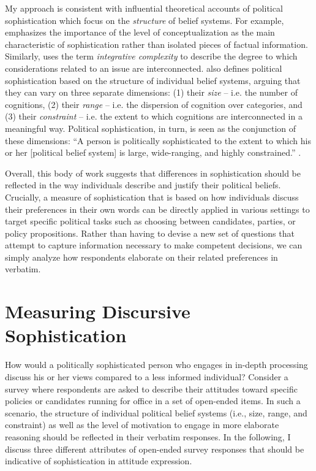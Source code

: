 My approach is consistent with influential theoretical accounts of political sophistication which focus on the \textit{structure} of belief systems. For example, \citet{converse1964nature} emphasizes the importance of the level of conceptualization as the main characteristic of sophistication rather than isolated pieces of factual information. Similarly, \citet{tetlock1983cognitive,tetlock1993cognitive} uses the term \textsl{integrative complexity} to describe the degree to which considerations related to an issue are interconnected. \citet{luskin1987measuring} also defines political sophistication based on the structure of individual belief systems, arguing that they can vary on three separate dimensions: (1) their \textsl{size} -- i.e. the number of cognitions, (2) their \textsl{range} -- i.e. the dispersion of cognition over categories, and (3) their \textsl{constraint} -- i.e. the extent to which cognitions are interconnected in a meaningful way. Political sophistication, in turn, is seen as the conjunction of these dimensions: ``A person is politically sophisticated to the extent to which his or her [political belief system] is large, wide-ranging, and highly constrained.'' \citep[860]{luskin1987measuring}.

Overall, this body of work suggests that differences in sophistication should be reflected in the way individuals describe and justify their political beliefs. Crucially, a measure of sophistication that is based on how individuals discuss their preferences in their own words can be directly applied in various settings to target specific political tasks such as choosing between candidates, parties, or policy propositions. Rather than having to devise a new set of questions that attempt to capture information necessary to make competent decisions, we can simply analyze how respondents elaborate on their related preferences in verbatim.


\section{Measuring Discursive Sophistication}

How would a politically sophisticated person who engages in in-depth processing discuss his or her views compared to a less informed individual? Consider a survey where respondents are asked to describe their attitudes toward specific policies or candidates running for office in a set of open-ended items. In such a scenario, the structure of individual political belief systems (i.e., size, range, and constraint) as well as the level of motivation to engage in more elaborate reasoning should be reflected in their verbatim responses. In the following, I discuss three different attributes of open-ended survey responses that should be indicative of sophistication in attitude expression.

